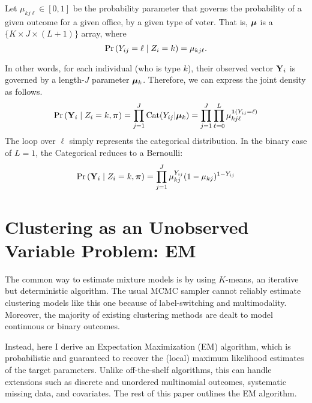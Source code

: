 \documentclass[11pt]{article}
\begin{document}
Let \(\mu_{kj\ell} \in [0, 1]\) be the probability parameter that governs the probability of a given outcome for a given office, by a given type of voter. That is, \(\bm{\mu}\) is a \(\{K \times J \times (L + 1)\}\) array, where
 \[\mathbb{\Pr}\left(Y_{ij} = \ell \mid Z_i = k\right) = \mu_{kj\ell}.\]

In other words, for each individual (who is  type \(k\)), their observed vector \(\mathbf{Y}_{i}\) is governed by a length-\(J\) parameter \(\bm{\mu}_{k}\). Therefore, we can express the joint density as follows.
\begin{align}
\mathbb{\Pr}\left(\mathbf{Y}_{i} \mid Z_{i} = k, \bm{\pi}\right) = \prod^{J}_{j = 1} \text{Cat}(Y_{ij} | \bm{\mu}_k) = \prod^{J}_{j = 1}\prod^{L}_{\ell=0} \mu_{kj\ell}^{\bm{1}\left(Y_{ij} = \ell\right)}
\end{align}
The loop over \(\ell\) simply represents the categorical distribution. In the binary case of \(L = 1\), the Categorical reduces to a Bernoulli:
\begin{align}
\mathbb{\Pr}\left(\mathbf{Y}_{i} \mid Z_{i} = k, \bm{\pi}\right) = \prod^{J}_{j=1}\mu_{kj}^{Y_{ij}}(1 - \mu_{kj})^{1- Y_{ij}}\nonumber
\end{align}


\section{Clustering as an Unobserved Variable Problem: EM}

The common way to estimate mixture models is by using \(K\)-means, an iterative but deterministic algorithm. The usual MCMC sampler cannot reliably estimate clustering models like this one because of label-switching and multimodality. Moreover, the majority of existing clustering methods are dealt to model continuous or binary outcomes.

Instead, here I derive an Expectation Maximization (EM) algorithm, which is probabilistic and guaranteed to recover the (local) maximum likelihood estimates of the target parameters. Unlike off-the-shelf algorithms, this can handle extensions such as discrete and unordered multinomial outcomes, systematic missing data, and covariates. The rest of this paper outlines the EM algorithm.
\end{document}
